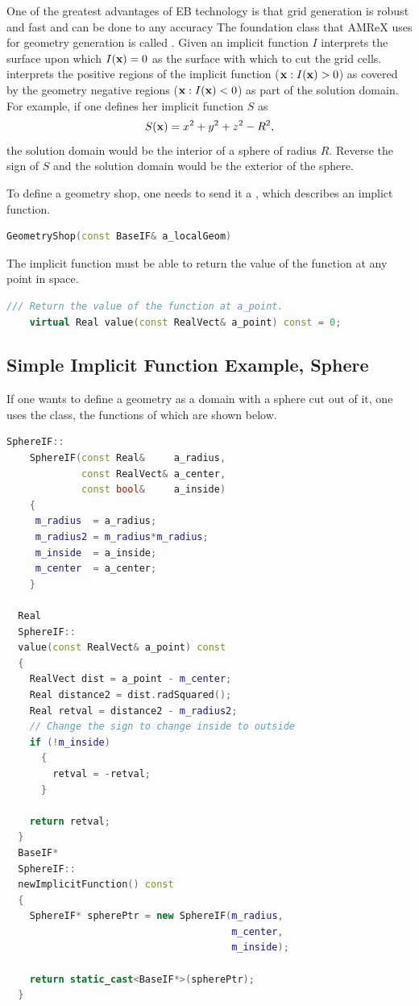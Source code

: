 One of the greatest advantages of EB technology is that grid
generation is robust and fast and can be done to any accuracy
The foundation class that AMReX uses for
geometry generation is called \geom.  Given an implicit
function $I$  \geom interprets the surface upon which $I({\bf x}) = 0$
as the surface with which to cut the grid cells.   \geom interprets
the positive regions of the implicit function (${\bf x}: I({\bf x}) > 0$)
as covered by the geometry  negative regions (${\bf x}: I({\bf x}) < 0$) 
as part of  the solution domain.  For example, if one defines her
implicit function $S$ as
$$
S({\bf x}) = x^2 + y^2 + z^2 - R^2,
$$
the solution domain would be the interior of a sphere of radius $R$.
Reverse the sign of $S$ and the solution domain would be the exterior
of the sphere.   

To define a geometry shop, one
needs to send it a \baseif, which describes an implict function. 

\begin{lstlisting}[language=cpp]
    GeometryShop(const BaseIF& a_localGeom)
\end{lstlisting}

The implicit function must be able to return the value of the function at any
point in space.

\begin{lstlisting}[language=cpp]
    /// Return the value of the function at a_point.  
    virtual Real value(const RealVect& a_point) const = 0;
\end{lstlisting}

\subsection{Simple Implicit Function Example, Sphere}

If one wants to define a geometry
as a domain with  a sphere cut out of it, one uses the \sphereif
class, the functions of which are shown below.

\begin{lstlisting}[language=cpp]
    SphereIF::
    SphereIF(const Real&     a_radius,
             const RealVect& a_center,
             const bool&     a_inside)
    {
     m_radius  = a_radius;
     m_radius2 = m_radius*m_radius;
     m_inside  = a_inside;
     m_center  = a_center;
    }

  Real
  SphereIF::
  value(const RealVect& a_point) const
  {
    RealVect dist = a_point - m_center;
    Real distance2 = dist.radSquared();
    Real retval = distance2 - m_radius2;
    // Change the sign to change inside to outside
    if (!m_inside)
      {
        retval = -retval;
      }

    return retval;
  }
  BaseIF* 
  SphereIF::
  newImplicitFunction() const
  {
    SphereIF* spherePtr = new SphereIF(m_radius,
                                       m_center,
                                       m_inside);

    return static_cast<BaseIF*>(spherePtr);
  }
\end{lstlisting}

